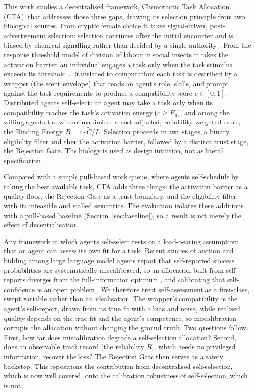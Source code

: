 \documentclass[11pt]{article}
\begin{document}
This work studies a decentralised framework, Chemotactic Task Allocation (CTA), that addresses those three gaps, drawing its selection principle from two biological sources. From cryptic female choice it takes signal-driven, post-advertisement selection: selection continues after the initial encounter and is biased by chemical signalling rather than decided by a single authority \citep{fitzpatrick2020cryptic}. From the response threshold model of division of labour in social insects it takes the activation barrier: an individual engages a task only when the task stimulus exceeds its threshold \citep{bonabeau1996threshold}. Translated to computation: each task is described by a wrapper (the scent envelope) that reads an agent's role, skills, and prompt against the task requirements to produce a compatibility score $c\in[0,1]$. Distributed agents self-select: an agent may take a task only when its compatibility reaches the task's activation energy ($c\geq E_a$), and among the willing agents the winner maximises a cost-adjusted, reliability-weighted score, the Binding Energy $B=c\cdot\tilde{C}/L$. Selection proceeds in two stages, a binary eligibility filter and then the activation barrier, followed by a distinct trust stage, the Rejection Gate. The biology is used as design intuition, not as literal specification.

Compared with a simple pull-based work queue, where agents self-schedule by taking the best available task, CTA adds three things: the activation barrier as a quality floor, the Rejection Gate as a trust boundary, and the eligibility filter with its infeasible and stalled semantics. The evaluation isolates these additions with a pull-based baseline (Section~\ref{sec:baseline}), so a result is not merely the effect of decentralisation.

Any framework in which agents self-select rests on a load-bearing assumption: that an agent can assess its own fit for a task. Recent studies of auction and bidding among large language model agents report that self-reported success probabilities are systematically miscalibrated, so an allocation built from self-reports diverges from the full-information optimum \citep{fradkin2026marketbench}, and calibrating that self-confidence is an open problem \citep{zhang2026confidence}. We therefore treat self-assessment as a first-class, swept variable rather than an idealisation. The wrapper's compatibility is the agent's self-report, drawn from its true fit with a bias and noise, while realised quality depends on the true fit and the agent's competence, so miscalibration corrupts the allocation without changing the ground truth. Two questions follow. First, how far does miscalibration degrade a self-selection allocation? Second, does an observable track record (the reliability $R$), which needs no privileged information, recover the loss? The Rejection Gate then serves as a safety backstop. This repositions the contribution from decentralised self-selection, which is now well covered, onto the calibration robustness of self-selection, which is not.
\end{document}
